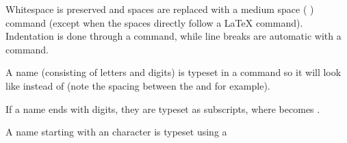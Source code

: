 \documentclass{book}
\begin{document}
\begin{mdUl}[class={list-star,loose},data-line={1659}]%
\begin{mdLi}[data-line={1659}]%
\begin{mdP}[data-line={1659}]%
{}Whitespace is preserved and spaces are replaced with a medium space (%
{}%
{}) command
  (except when the spaces directly follow a LaTeX command). Indentation is done through
  a %
{}%
{} command, while line breaks are automatic with a %
{}%
{} command.%
\end{mdP}%
\end{mdLi}%
\begin{mdLi}[data-line={1663}]%
\begin{mdP}[data-line={1663}]%
{}A name (consisting of letters and digits) is typeset in a %
{}%
{} command so 
  it will look like %
{}%
{} instead of %
{}%
{} (note the spacing
  between the %
{}%
{} and %
{}%
{} for example).%
\end{mdP}%
\end{mdLi}%
\begin{mdLi}[data-line={1667}]%
\begin{mdP}[data-line={1667}]%
{}If a name ends with digits, they are typeset as subscripts, where %
{}%
{} becomes %
{}%
{}.%
\end{mdP}%
\end{mdLi}%
\begin{mdLi}[data-line={1669}]%
\begin{mdP}[data-line={1669}]%
{}A name starting with an %
{}%
{} character is typeset using a %

\end{mdP}
\end{mdLi}
\end{mdUl}
\end{document}
